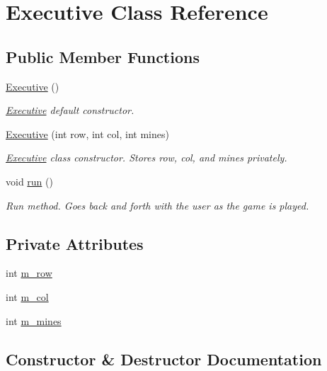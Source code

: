\hypertarget{classExecutive}{}\section{Executive Class Reference}
\label{classExecutive}
\subsection*{Public Member Functions}
\begin{DoxyCompactItemize}
\item 
\hyperlink{classExecutive_ad870c1d741f1f313eb0c5a8336f8af6b}{Executive} ()
\begin{DoxyCompactList}\small\item\em \hyperlink{classExecutive}{Executive} default constructor. \end{DoxyCompactList}\item 
\hyperlink{classExecutive_aba04ac26e87ba31abbcb7ef5dd1496dc}{Executive} (int row, int col, int mines)
\begin{DoxyCompactList}\small\item\em \hyperlink{classExecutive}{Executive} class constructor. Stores row, col, and mines privately. \end{DoxyCompactList}\item 
void \hyperlink{classExecutive_adef7cad3387e8fc79d92ffd418f45258}{run} ()
\begin{DoxyCompactList}\small\item\em Run method. Goes back and forth with the user as the game is played. \end{DoxyCompactList}\end{DoxyCompactItemize}
\subsection*{Private Attributes}
\begin{DoxyCompactItemize}
\item 
int \hyperlink{classExecutive_a17f2f07509efcc571fff0a5146064acc}{m\+\_\+row}
\item 
int \hyperlink{classExecutive_a725353609296ca4465d816e2114cac74}{m\+\_\+col}
\item 
int \hyperlink{classExecutive_adbe023edaa353b9017c293fe186fc465}{m\+\_\+mines}
\end{DoxyCompactItemize}


\subsection{Constructor \& Destructor Documentation}
\mbox{\label{classExecutive_ad870c1d741f1f313eb0c5a8336f8af6b}} 
